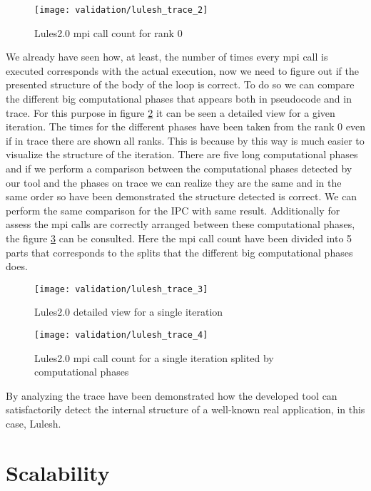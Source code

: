 \begin{figure}
    \centering
    \texttt{[image: validation/lulesh\_trace\_2]}
    \caption{Lules2.0 mpi call count for rank 0}
    \label{fig:lulesh_trace_2}
\end{figure}


We already have seen how, at least, the number of times every mpi call is
executed corresponds with the actual execution, now we need to figure out if the
presented structure of the body of the loop is correct. To do so we can compare
the different big computational phases that appears both in pseudocode and in
trace. For this purpose in figure \ref{fig:lulesh_trace_3} it can be seen a 
detailed view for a given iteration. The times for the different phases have
been taken from the rank 0 even if in trace there are shown all ranks. This is
because by this way is much easier to visualize the structure of the iteration. There
are five long computational phases and if we perform a comparison between the
computational phases detected by our tool and the phases on trace we
can realize they are the same and in the same order so have been demonstrated
the structure detected is correct. We can perform the same comparison for the
IPC with same result. Additionally for assess the mpi calls are
correctly arranged between these computational phases, the figure
\ref{fig:lulesh_trace_4} can be consulted. Here the mpi call count have been
divided into 5 parts that corresponds to the splits that the different big
computational phases does. 

\begin{figure}
    \centering
    \texttt{[image: validation/lulesh\_trace\_3]}
    \caption{Lules2.0 detailed view for a single iteration}
    \label{fig:lulesh_trace_3}
\end{figure}
\begin{figure}
    \centering
    \texttt{[image: validation/lulesh\_trace\_4]}
    \caption{Lules2.0 mpi call count for a single iteration splited by
    computational phases}
    \label{fig:lulesh_trace_4}
\end{figure}

By analyzing the trace have been demonstrated how the developed tool can
satisfactorily detect the internal structure of a well-known real application,
in this case, Lulesh.


\section{Scalability}\label{s:scalability}

